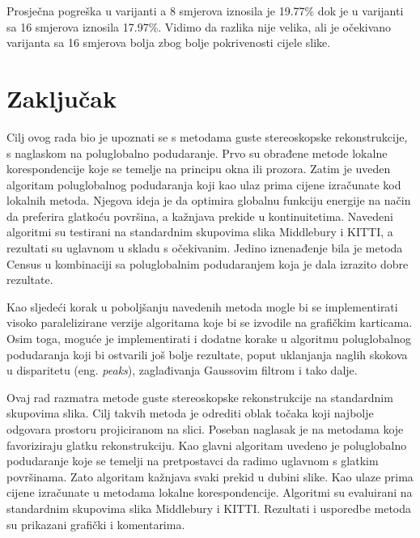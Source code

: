 \documentclass[utf8, zavrsni, numeric]{fer}
\begin{document}
Prosječna pogreška u varijanti a 8 smjerova iznosila je 19.77\% dok je u varijanti sa 16
smjerova iznosila 17.97\%. Vidimo da razlika nije velika, ali je očekivano varijanta sa 16 smjerova bolja zbog bolje pokrivenosti cijele slike.

\chapter{Zaključak}
Cilj ovog rada bio je upoznati se s metodama guste stereoskopske rekonstrukcije, s naglaskom
na poluglobalno podudaranje. Prvo su obrađene metode lokalne korespondencije koje se temelje
na principu okna ili prozora. Zatim je uveden algoritam poluglobalnog podudaranja koji kao ulaz
prima cijene izračunate kod lokalnih metoda. Njegova ideja je da optimira globalnu funkciju energije na način da preferira glatkoću površina, a kažnjava prekide u kontinuitetima.
Navedeni algoritmi su testirani na standardnim skupovima slika Middlebury i KITTI, a rezultati
su uglavnom u skladu s očekivanim. Jedino iznenađenje bila je metoda Census u kombinaciji sa poluglobalnim podudaranjem koja je dala izrazito dobre rezultate.

Kao sljedeći korak u poboljšanju navedenih metoda mogle bi se implementirati visoko paralelizirane verzije algoritama
koje bi se izvodile na grafičkim karticama. Osim toga, moguće je implementirati i dodatne
korake u algoritmu poluglobalnog podudaranja koji bi ostvarili još bolje rezultate, poput
uklanjanja naglih skokova u disparitetu (eng. {\sl peaks}), zaglađivanja Gaussovim filtrom i tako dalje.




\begin{sazetak}
  Ovaj rad razmatra metode guste stereoskopske rekonstrukcije na standardnim skupovima slika.
  Cilj takvih metoda je odrediti oblak točaka koji najbolje odgovara prostoru projiciranom
  na slici.
  Poseban naglasak je na metodama koje favoriziraju glatku rekonstrukciju. Kao glavni
  algoritam uvedeno je poluglobalno podudaranje koje se temelji na pretpostavci da radimo
  uglavnom s glatkim površinama. Zato algoritam kažnjava svaki prekid u dubini slike. Kao
  ulaze prima cijene izračunate u metodama lokalne korespondencije. Algoritmi su
  evaluirani na standardnim skupovima slika Middlebury i KITTI. Rezultati i usporedbe metoda su prikazani
  grafički i komentarima.

\end{sazetak}
\end{document}
